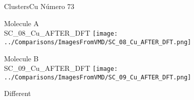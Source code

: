  \newpage

\vtab[-3cm]
\begin{center}
{\large ClustersCu \tab Número 73}
\end{center}
\begin{multicols}{2}
\begin{center}
Molecule A \\ 
SC\_08\_Cu\_AFTER\_DFT
\texttt{[image: ../Comparisons/ImagesFromVMD/SC\_08\_Cu\_AFTER\_DFT.png]}
\\
\vtab

\columnbreak
Molecule B \\ 
SC\_09\_Cu\_AFTER\_DFT
\texttt{[image: ../Comparisons/ImagesFromVMD/SC\_09\_Cu\_AFTER\_DFT.png]}
\\
\vtab


\end{center}
\end{multicols}
\begin{center}
\textcolor{NavyBlue}{\Large Different}
\end{center}

 \newpage

